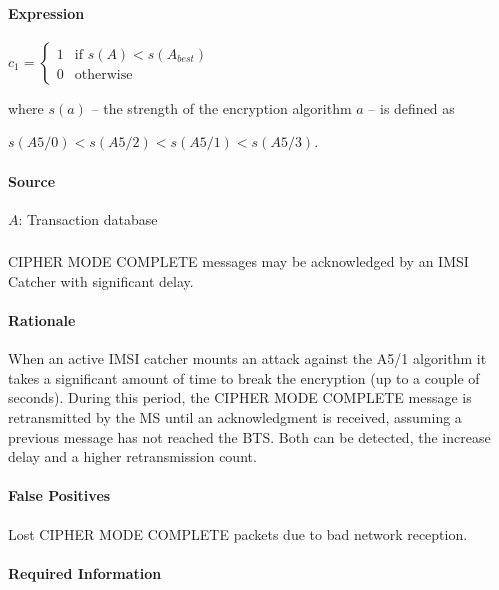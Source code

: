 \documentclass[a4paper,11pt,notitlepage,bigheadings,oneside]{scrartcl}
\begin{document}
\paragraph{Expression}

$c_1 =
\begin{cases}
	1 & \text{if } s(A) < s(A_{best}) \\
	0 & \text{otherwise}
\end{cases}$

where $s(a)$ -- the strength of the encryption algorithm $a$ -- is defined as

$s(A5/0) < s(A5/2) < s(A5/1) < s(A5/3)$.

\paragraph{Source}

$A$: Transaction database


\subsubsection{}

CIPHER MODE COMPLETE messages may be acknowledged by an IMSI Catcher with
significant delay.

\paragraph{Rationale}

When an active IMSI catcher mounts an attack against the A5/1 algorithm it
takes a significant amount of time to break the encryption (up to a couple of
seconds). During this period, the CIPHER MODE COMPLETE message is retransmitted
by the MS until an acknowledgment is received, assuming a previous message has
not reached the BTS. Both can be detected, the increase delay and a higher
retransmission count.

\paragraph{False Positives}

Lost CIPHER MODE COMPLETE packets due to bad network reception.

\paragraph{Required Information}
\end{document}
